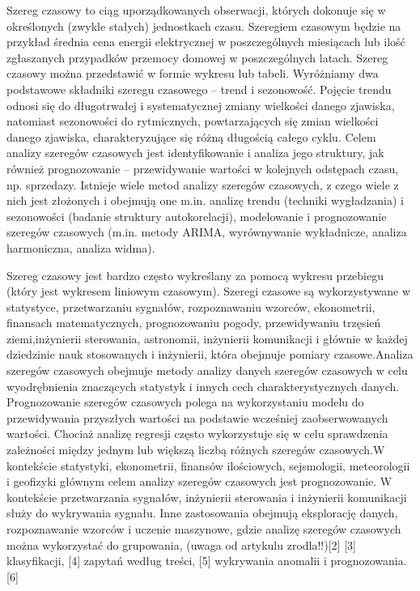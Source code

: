 Szereg czasowy to ciąg uporządkowanych obserwacji, których dokonuje się w określonych (zwykle stałych) jednostkach czasu. Szeregiem czasowym będzie na przykład średnia cena energii elektrycznej w poszczególnych miesiącach lub ilość zgłaszanych przypadków przemocy domowej w poszczególnych latach. Szereg czasowy można przedstawić w formie wykresu lub tabeli.
Wyróżniamy dwa podstawowe składniki szeregu czasowego – trend i sezonowość. Pojęcie trendu odnosi się do długotrwałej i systematycznej zmiany wielkości danego zjawiska, natomiast sezonowości do rytmicznych, powtarzających się zmian wielkości danego zjawiska, charakteryzujące się różną długością całego cyklu. 
Celem analizy szeregów czasowych jest identyfikowanie i analiza jego struktury, jak również prognozowanie – przewidywanie wartości w kolejnych odstępach czasu, np. sprzedazy. Istnieje wiele metod analizy szeregów czasowych, z czego wiele z nich jest złożonych i obejmują one m.in. analizę trendu (techniki wygładzania) i sezonowości (badanie struktury autokorelacji), modelowanie i prognozowanie szeregów czasowych (m.in. metody ARIMA, wyrównywanie wykładnicze, analiza harmoniczna, analiza widma).\cite{szereg2023}

Szereg czasowy jest bardzo często wykreślany za pomocą wykresu przebiegu (który jest wykresem liniowym czasowym). Szeregi czasowe są wykorzystywane w statystyce, przetwarzaniu sygnałów, rozpoznawaniu wzorców, ekonometrii, finansach matematycznych, prognozowaniu pogody, przewidywaniu trzęsień ziemi,inżynierii sterowania, astronomii, inżynierii komunikacji i głównie w każdej dziedzinie nauk stosowanych i inżynierii, która obejmuje pomiary czasowe.Analiza szeregów czasowych obejmuje metody analizy danych szeregów czasowych w celu wyodrębnienia znaczących statystyk i innych cech charakterystycznych danych. Prognozowanie szeregów czasowych polega na wykorzystaniu modelu do przewidywania przyszłych wartości na podstawie wcześniej zaobserwowanych wartości. Chociaż analizę regresji często wykorzystuje się w celu sprawdzenia zależności między jednym lub większą liczbą różnych szeregów czasowych.W kontekście statystyki, ekonometrii, finansów ilościowych, sejsmologii, meteorologii i geofizyki głównym celem analizy szeregów czasowych jest prognozowanie. W kontekście przetwarzania sygnałów, inżynierii sterowania i inżynierii komunikacji służy do wykrywania sygnału. Inne zastosowania obejmują eksplorację danych, rozpoznawanie wzorców i uczenie maszynowe, gdzie analizę szeregów czasowych można wykorzystać do grupowania, (uwaga od artykulu zrodla!!)[2] [3] klasyfikacji, [4] zapytań według treści, [5] wykrywania anomalii i prognozowania.[6]\cite{series2023}

